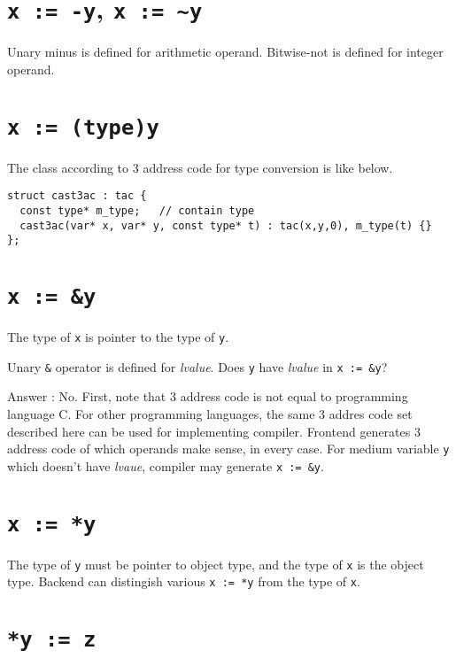 \section{{\tt{x := -y}}, {\tt{x := \~{}y}}}

Unary minus is defined for arithmetic operand.
Bitwise-not is defined for integer operand.

\section{{\tt{x := (type)y}}}

The class according to 3 address code for type conversion is like
below.
\begin{verbatim}
struct cast3ac : tac {
  const type* m_type;   // contain type
  cast3ac(var* x, var* y, const type* t) : tac(x,y,0), m_type(t) {}
};  
\end{verbatim}

\section{{\tt{x := \&y}}}

The type of {\tt{x}} is pointer to the type of {\tt{y}}.

\begin{QandA}
Unary {\tt{\&}} operator is defined for {\it lvalue}.
Does {\tt {y}} have {\it lvalue} in {\tt{x := \&y}}?

Answer : No. First, note that 3 address code is not
equal to programming language C. For other programming
languages, the same 3 addres code set described here
can be used for implementing compiler. Frontend generates
3 address code of which operands make sense, in every case.
For medium variable {\tt{y}} which doesn't have {\it lvaue},
compiler may generate {\tt{x := \&y}}.
\end{QandA}

\section{{\tt{x := *y}}}

The type of {\tt{y}} must be pointer to object type,
and the type of {\tt{x}} is the object type.
Backend can distingish various {\tt{x := *y}} from the type of {\tt{x}}.

\section{{\tt{*y := z}}}

